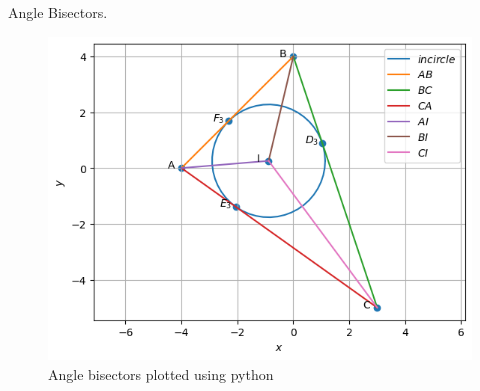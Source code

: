 \begin{table}[H]
        \centering
        
        \caption{Angle Bisectors.}
        \label{tab:Angle_bisector}
    \end{table}
\begin{figure}[H]
\includegraphics[width=\columnwidth]{angle_bisector/figs/Incentre.png}
\caption{Angle bisectors plotted using python}
\label{fig:i_angle_bisector_py}
\end{figure}
